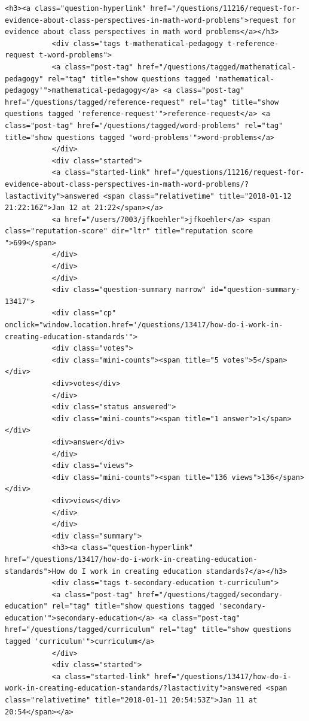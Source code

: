\documentclass[11pt]{article}
\begin{document}
\begin{Verbatim}[commandchars=\\\{\}]
           <h3><a class="question-hyperlink" href="/questions/11216/request-for-evidence-about-class-perspectives-in-math-word-problems">request for evidence about class perspectives in math word problems</a></h3>
           <div class="tags t-mathematical-pedagogy t-reference-request t-word-problems">
           <a class="post-tag" href="/questions/tagged/mathematical-pedagogy" rel="tag" title="show questions tagged 'mathematical-pedagogy'">mathematical-pedagogy</a> <a class="post-tag" href="/questions/tagged/reference-request" rel="tag" title="show questions tagged 'reference-request'">reference-request</a> <a class="post-tag" href="/questions/tagged/word-problems" rel="tag" title="show questions tagged 'word-problems'">word-problems</a>
           </div>
           <div class="started">
           <a class="started-link" href="/questions/11216/request-for-evidence-about-class-perspectives-in-math-word-problems/?lastactivity">answered <span class="relativetime" title="2018-01-12 21:22:16Z">Jan 12 at 21:22</span></a>
           <a href="/users/7003/jfkoehler">jfkoehler</a> <span class="reputation-score" dir="ltr" title="reputation score ">699</span>
           </div>
           </div>
           </div>
           <div class="question-summary narrow" id="question-summary-13417">
           <div class="cp" onclick="window.location.href='/questions/13417/how-do-i-work-in-creating-education-standards'">
           <div class="votes">
           <div class="mini-counts"><span title="5 votes">5</span></div>
           <div>votes</div>
           </div>
           <div class="status answered">
           <div class="mini-counts"><span title="1 answer">1</span></div>
           <div>answer</div>
           </div>
           <div class="views">
           <div class="mini-counts"><span title="136 views">136</span></div>
           <div>views</div>
           </div>
           </div>
           <div class="summary">
           <h3><a class="question-hyperlink" href="/questions/13417/how-do-i-work-in-creating-education-standards">How do I work in creating education standards?</a></h3>
           <div class="tags t-secondary-education t-curriculum">
           <a class="post-tag" href="/questions/tagged/secondary-education" rel="tag" title="show questions tagged 'secondary-education'">secondary-education</a> <a class="post-tag" href="/questions/tagged/curriculum" rel="tag" title="show questions tagged 'curriculum'">curriculum</a>
           </div>
           <div class="started">
           <a class="started-link" href="/questions/13417/how-do-i-work-in-creating-education-standards/?lastactivity">answered <span class="relativetime" title="2018-01-11 20:54:53Z">Jan 11 at 20:54</span></a>

\end{Verbatim}
\end{document}
